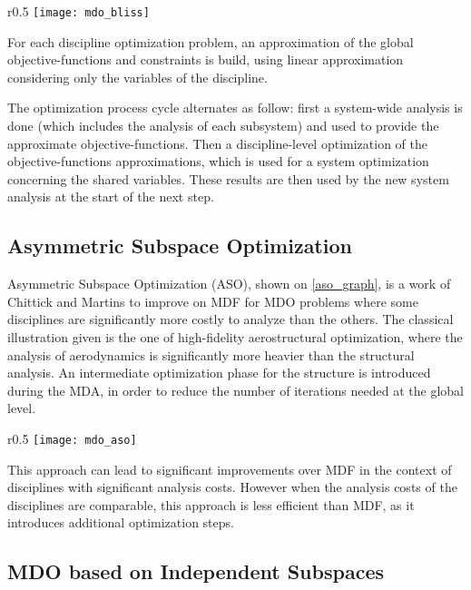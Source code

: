 \begin{wrapfigure}{r}{0.5\textwidth}
\centering
\texttt{[image: mdo\_bliss]}
\caption{BLISS method.}\label{bliss_graph}
\end{wrapfigure}

For each discipline optimization problem, an approximation of the global objective-functions and constraints is build, using linear approximation considering only the variables of the discipline.

The optimization process cycle alternates as follow: first a system-wide analysis is done (which includes the analysis of each subsystem) and used to provide the approximate objective-functions. Then a discipline-level optimization of the objective-functions approximations, which is used for a system optimization concerning the shared variables. These results are then used by the new system analysis at the start of the next step.

\subsection{Asymmetric Subspace Optimization}

Asymmetric Subspace Optimization (ASO), shown on \figurename{} \ref{aso_graph}, is a work of Chittick and Martins \cite{Chittick:2007:B} to improve on MDF for MDO problems where some disciplines are significantly more costly to analyze than the others. The classical illustration given is the one of high-fidelity aerostructural optimization, where the analysis of aerodynamics is significantly more heavier than the structural analysis. An intermediate optimization phase for the structure is introduced during the MDA, in order to reduce the number of iterations needed at the global level.

\begin{wrapfigure}{r}{0.5\textwidth}
\centering
\texttt{[image: mdo\_aso]}
\caption{ASO method.}\label{aso_graph}
\end{wrapfigure}

This approach can lead to significant improvements over MDF in the context of disciplines with significant analysis costs. However when the analysis costs of the disciplines are comparable, this approach is less efficient than MDF, as it introduces additional optimization steps.

\subsection{MDO based on Independent Subspaces}

